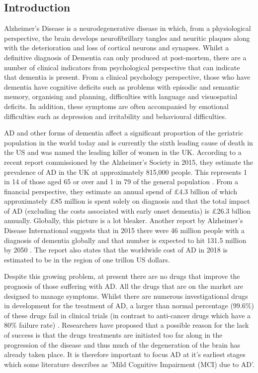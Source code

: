 \documentclass{article}
\begin{document}
\subsection{Introduction}
Alzheimer's Disease is a neurodegenerative disease in which, from a physiological perspective, the brain develops neurofibrillary tangles and neuritic plaques along with the deterioration and loss of cortical neurons and synapses. Whilst a definitive diagnosis of Dementia can only produced at post-mortem, there are a number of clinical indicators from psychological perspective that can indicate that dementia is present. From a clinical psychology perspective, those who have dementia have cognitive deficits such as problems with episodic and semantic memory, organising and planning, difficulties with language and visuospatial deficits\cite{AmericanPsychiatricAssociation2013}. In addition, these symptoms are often accompanied by emotional difficulties such as depression and irritability and behavioural difficulties. 
\par
AD and other forms of dementia affect a significant proportion of the geriatric population in the world today and is currently the sixth leading cause of death in the US and was named the leading killer of women in the UK. According to a recent report commissioned by the Alzheimer's Society in 2015, they estimate the prevalence of AD in the UK at approximately 815,000 people. This represents 1 in 14 of those aged 65 or over and 1 in 79 of the general population \cite{Sturrock2016}. From a financial perspective, they estimate an annual spend of £4.3 billion of which approximately £85 million is spent solely on diagnosis and that the total impact of AD (excluding the costs associated with early onset dementia) is £26.3 billion annually. Globally, this picture is a lot bleaker. Another report by Alzheimer's Disease International suggests that in 2015 there were 46 million people with a diagnosis of dementia globally and that number is expected to hit 131.5 million by 2050 \cite{Prince2015}. The report also states that the worldwide cost of AD in 2018 is estimated to be in the region of one trillon US dollars.
\par
Despite this growing problem, at present there are no drugs that improve the prognosis of those suffering with AD. All the drugs that are on the market are designed to manage symptoms. Whilst there are numerous investigational drugs in development for the treatment of AD, a larger than normal percentage (99.6\%) of these drugs fail in clinical trials (in contrast to anti-cancer drugs which have a 80\% failure rate) \cite{Alzheimer2016}. Researchers have proposed that a possible reason for the lack of success is that the drugs treatments are initiated too far along in the progression of the disease and thus much of the degeneration of the brain has already taken place. It is therefore important to focus AD at it's earliest stages which some literature describes as 'Mild Cognitive Impairment (MCI) due to AD'.
\end{document}
